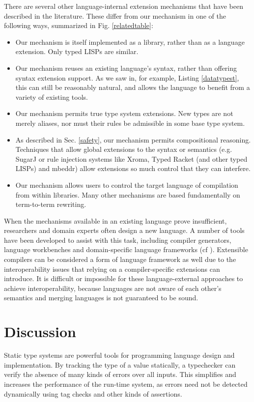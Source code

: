 \documentclass[9pt,preprint]{sigplanconf}
\begin{document}
There are several other language-internal extension mechanisms that have been described in the literature. These differ from our mechanism in one of the following ways, summarized in Fig. \ref{relatedtable}:
\begin{itemize}
\item Our mechanism is itself implemented as a library, rather than as a language extension. Only typed LISPs are similar.
\item Our mechanism reuses an existing language's syntax, rather than offering syntax extension support. As we saw in, for example, Listing \ref{datatypest}, this can still be reasonably natural, and allows the language to benefit from a variety of existing tools.
\item Our mechanism permits true type system extensions. New types are not merely aliases, nor must their rules be admissible in some base type system.%
\item As described in Sec. \ref{safety}, our mechanism permits compositional reasoning. Techniques that allow global extensions to the syntax or semantics (e.g. SugarJ or rule injection systems like Xroma, Typed Racket (and other typed LISPs) and mbeddr) allow extensions so much control that they can interfere.
\item Our mechanism allows users to control the target language of compilation from within libraries. Many other mechanisms are based fundamentally on term-to-term rewriting.
\end{itemize}

When the mechanisms available in an existing language prove insufficient, researchers and domain experts often design a new language. A number of tools have been developed to assist with this task, including compiler generators, language workbenches and domain-specific language frameworks (cf \cite{erdweg2013state}). Extensible compilers can be considered a form of language framework as well due to the interoperability issues that relying on a compiler-specific extensions can introduce. It is difficult or impossible for these language-external approaches to achieve interoperability, because languages are not aware of each other's semantics and merging languages is not guaranteed to be sound.

\section{Discussion}\label{discussion}
Static type systems are powerful tools for programming language design and implementation. By tracking the type of a value statically, a typechecker can verify the absence of many kinds of errors over all inputs. This simplifies and increases the performance of the run-time system, as errors need not be detected dynamically using tag checks and other kinds of assertions.
\end{document}
